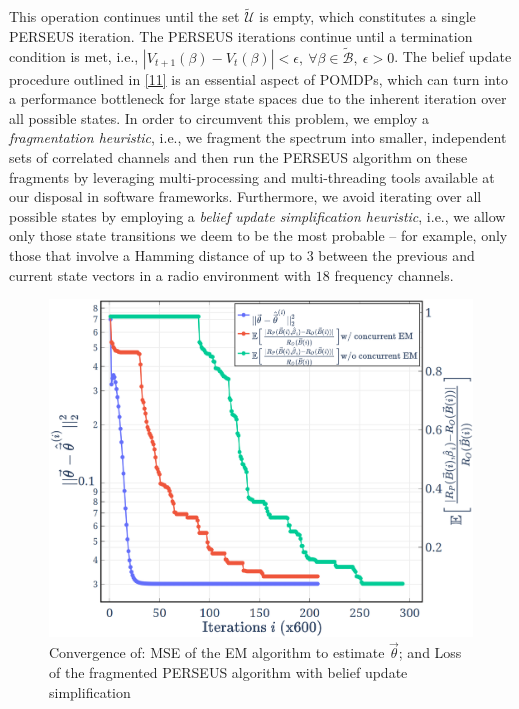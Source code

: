 \documentclass[10pt,twocolumn]{IEEEtran}
\begin{document}
This operation continues until the set $\tilde{\mathcal{U}}$ is empty, which constitutes a single PERSEUS iteration. The PERSEUS iterations continue until a termination condition is met, i.e., $|V_{t{+}1}(\beta){-}V_{t}(\beta)|{<}\epsilon,\ \forall \beta{\in} \tilde{\mathcal{B}},\ \epsilon{>}0$. The belief update procedure outlined in \eqref{11} is an essential aspect of POMDPs, which can turn into a performance bottleneck for large state spaces due to the inherent iteration over all possible states. In order to circumvent this problem, we employ a \emph{fragmentation heuristic}, i.e., we fragment the spectrum into smaller, independent sets of correlated channels and then run the PERSEUS algorithm on these fragments by leveraging multi-processing and multi-threading tools available at our disposal in software frameworks. Furthermore, we avoid iterating over all possible states by employing a \emph{belief update simplification heuristic}, i.e., we allow only those state transitions we deem to be the most probable -- for example, only those that involve a Hamming distance of up to $3$ between the previous and current state vectors in a radio environment with $18$ frequency channels.
\begin{figure}[t]
    \centering
    \includegraphics[width=0.8\linewidth]{Evaluation_1.png}
    \caption{Convergence of: MSE of the EM algorithm to estimate $\vec{\theta}$; and Loss of the fragmented PERSEUS algorithm with belief update simplification}
    \label{fig:4}
    \vspace{-6mm}
\end{figure}
\vspace{-3mm}
\end{document}
